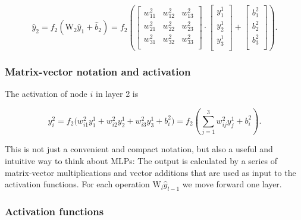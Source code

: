 \documentclass[11pt]{article}
\begin{document}
\[
\begin{equation}
 \hat{y}_2 = f_2(\mathrm{W}_2 \hat{y}_{1} + \hat{b}_{2}) = 
 f_2\left(\left[\begin{array}{ccc}
    w^2_{11} &w^2_{12} &w^2_{13} \\
    w^2_{21} &w^2_{22} &w^2_{23} \\
    w^2_{31} &w^2_{32} &w^2_{33} \\
    \end{array} \right] \cdot
    \left[\begin{array}{c}
           y^1_1 \\
           y^1_2 \\
           y^1_3 \\
          \end{array}\right] + 
    \left[\begin{array}{c}
           b^2_1 \\
           b^2_2 \\
           b^2_3 \\
          \end{array}\right]\right).
\label{_auto6} \tag{11}
\end{equation}
\]

    \hypertarget{matrix-vector-notation-and-activation}{%
\subsubsection{Matrix-vector notation and
activation}\label{matrix-vector-notation-and-activation}}

The activation of node \(i\) in layer 2 is

    \hypertarget{_auto7}{}

\[
\begin{equation}
 y^2_i = f_2\Bigr(w^2_{i1}y^1_1 + w^2_{i2}y^1_2 + w^2_{i3}y^1_3 + b^2_i\Bigr) = 
 f_2\left(\sum_{j=1}^3 w^2_{ij} y_j^1 + b^2_i\right).
\label{_auto7} \tag{12}
\end{equation}
\]

    This is not just a convenient and compact notation, but also a useful
and intuitive way to think about MLPs: The output is calculated by a
series of matrix-vector multiplications and vector additions that are
used as input to the activation functions. For each operation
\(\mathrm{W}_l \hat{y}_{l-1}\) we move forward one layer.

\hypertarget{activation-functions}{%
\subsubsection{Activation functions}\label{activation-functions}}
\end{document}
